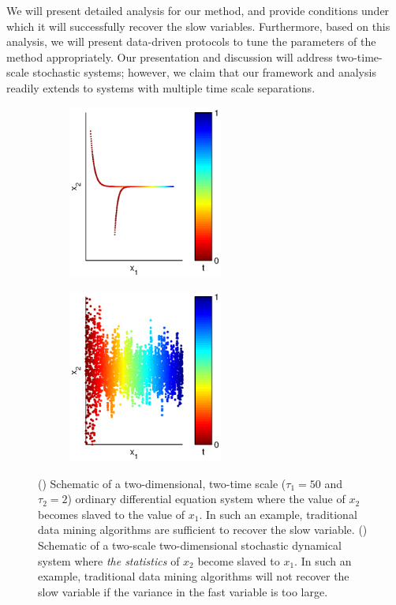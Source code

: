We will present detailed analysis for our method, and provide conditions under which it will successfully recover the slow variables.
%
Furthermore, based on this analysis, we will present data-driven protocols to tune the parameters of the method appropriately.
%
Our presentation and discussion will address two-time-scale stochastic systems; however, we claim that
our framework and analysis readily extends to systems with multiple time scale separations.
%

\begin{figure}[t]

\centering

\begin{subfigure}{0.4\textwidth}
\centering
\includegraphics[width=2in]{schematic_DS1}
\caption{}
\label{subfig:schematic_fastslow1}
\end{subfigure}
%
\begin{subfigure}{0.4\textwidth}
\centering
\includegraphics[width=2in]{schematic_DS2}
\caption{}
\label{subfig:schematic_fastslow2}
\end{subfigure}
%
\caption[Schematic of two-time scale data]{() Schematic of a two-dimensional, two-time scale ($\tau_1 = 50$ and $\tau_2=2$) ordinary differential equation system where the value of $x_2$ becomes slaved to the value of $x_1$.
%
In such an example, traditional data mining algorithms are sufficient to recover the slow variable. () Schematic of a two-scale two-dimensional stochastic dynamical system where {\em the statistics} of $x_2$ become slaved to $x_1$.
%
In such an example, traditional data mining algorithms will not recover the slow variable if the variance in the fast variable is too large. }
\label{fig:schematic_fastslow}
\end{figure}

